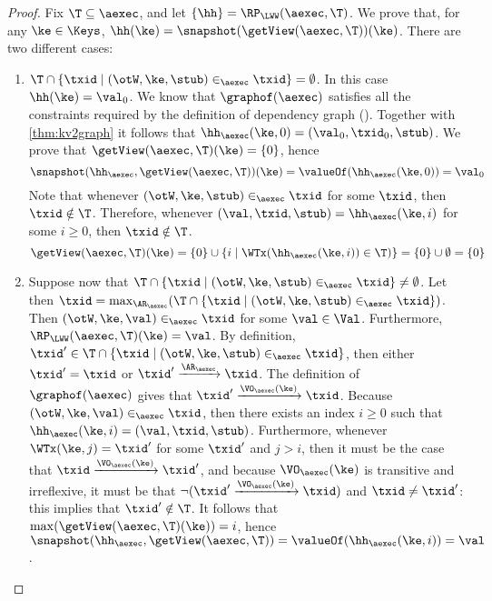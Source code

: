 \begin{proof}
Fix $\T \subseteq \aexec$, and let $\{\hh\} = \RP_{\LWW}(\aexec, \T)$. We prove that, for any $\ke \in \Keys$, 
$\hh(\ke) = \snapshot(\getView(\aexec, \T))(\ke)$. There are two different cases: 
\begin{enumerate}
\item $\T \cap \{ \txid \mid (\otW, \ke, \stub) \in_{\aexec} \txid \} = \emptyset$. 
In this case $\hh(\ke) = \val_0$. 
We know that $\graphof(\aexec)$ satisfies all the constraints required by the definition of dependency graph 
(\cite{laws}). Together with \cref{thm:kv2graph} it follows that $\hh_{\aexec}(\ke, 0) = (\val_0, \txid_0, \stub)$.
We prove that $\getView(\aexec, \T)(\ke) = \{0\}$, 
hence 
\[ 
\snapshot(\hh_{\aexec}, \getView(\aexec, \T))(\ke) = \valueOf(\hh_{\aexec}(\ke, 0)) = \val_{0}
\]
Note that whenever $(\otW, \ke, \stub) \in_{\aexec} \txid$ for some $\txid$, then 
$\txid \notin \T$. Therefore, whenever $(\val, \txid, \stub) = \hh_{\aexec}(\ke, i)$ for some $i \geq 0$, then 
$\txid \notin \T$.
\[
\getView(\aexec, \T)(\ke) = \{0\} \cup \{i \mid \WTx(\hh_{\aexec}(\ke, i)) \in \T)\} = \{0\} \cup \emptyset = \{0\}
\]
\item Suppose now that $\T \cap \{ \txid \mid (\otW, \ke, \stub) \in_{\aexec} \txid \} \neq \emptyset$. 
Let then $\txid = \max_{\AR_{\aexec}}(\T \cap \{\txid \mid (\otW, \ke, \stub) \in_{\aexec} \txid\})$. 
Then $(\otW, \ke, \val) \in_{\aexec} \txid$ for some $\val \in \Val$. Furthermore, $\RP_{\LWW}(\aexec, \T)(\ke) = \val$.
By definition, $\txid' \in \T \cap \{ \txid \mid (\otW, \ke, \stub) \in_{\aexec} \txid\}$, 
then either $\txid' = \txid$ or $\txid' \xrightarrow{\AR_{\aexec}} \txid$. The definition of 
$\graphof(\aexec)$ gives that $\txid' \xrightarrow{\VO_{\aexec}(\ke)} \txid$. 
Because $(\otW, \ke, \val) \in_{\aexec} \txid$, then there exists an index 
$i \geq 0$ such that $\hh_{\aexec}(\ke, i) = (\val, \txid, \stub)$. Furthermore, 
whenever $\WTx(\ke, j) = \txid'$ for some $\txid'$ and $j > i$, then it must 
be the case that $\txid \xrightarrow{\VO_{\aexec}(\ke)} \txid'$, and because 
$\VO_{\aexec}(\ke)$ is transitive and irreflexive, it must be that  
$\neg( \txid' \xrightarrow{\VO_{\aexec}(\ke)} \txid)$ and $\txid \neq \txid'$: this implies that 
$\txid' \notin \T$. It follows that $\max(\getView(\aexec, \T)(\ke)) = i$, hence 
$\snapshot(\hh_{\aexec}, \getView(\aexec, \T)) = \valueOf(\hh_{\aexec}(\ke, i)) = \val$.
\end{enumerate}
\end{proof}


